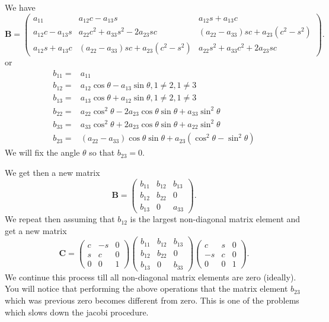 \documentclass[%
oneside,                 %
final,                   %
10pt]{article}
\begin{document}
We have
\[
 \mathbf{B} =\left( \begin{array}{ccc} 
                a_{11} & a_{12}c -a_{13}s& a_{12}s+a_{13}c    \\
                a_{12}c -a_{13}s & a_{22}c^2+a_{33}s^2 -2a_{23}sc& (a_{22}-a_{33})sc +a_{23}(c^2-s^2)     \\
                a_{12}s+a_{13}c & (a_{22}-a_{33})sc +a_{23}(c^2-s^2) & a_{22}s^2+a_{33}c^2 +2a_{23}sc
             \end{array} \right).
\]
or
\begin{align*}
b_{11} =& a_{11} \\
b_{12} =& a_{12}\cos\theta - a_{13}\sin\theta , 1 \ne 2, 1 \ne 3 \\
b_{13} =& a_{13}\cos\theta + a_{12}\sin\theta , 1 \ne 2, 1 \ne 3 \nonumber\\
b_{22} =& a_{22}\cos^2\theta - 2a_{23}\cos\theta \sin\theta +a_{33}\sin^2\theta\nonumber\\
b_{33} =& a_{33}\cos^2\theta +2a_{23}\cos\theta \sin\theta +a_{22}\sin^2\theta\nonumber\\
b_{23} =& (a_{22}-a_{33})\cos\theta \sin\theta +a_{23}(\cos^2\theta-\sin^2\theta)\nonumber 
\end{align*}
We will fix the angle $\theta$ so that $b_{23}=0$.

We get then a new matrix
\[
 \mathbf{B} =\left( \begin{array}{ccc} 
                b_{11} & b_{12}& b_{13}    \\
                b_{12}& b_{22}& 0    \\
                b_{13}& 0& a_{33}
             \end{array} \right).
\]
We repeat then assuming that $b_{12}$ is the largest non-diagonal matrix element and get a
new matrix 
\[
 \mathbf{C} =
      \left( \begin{array}{ccc} 
                c & -s & 0    \\
                s & c & 0     \\
                0 & 0 & 1
             \end{array} \right)\left( \begin{array}{ccc} 
                b_{11} & b_{12} & b_{13}    \\
                b_{12} & b_{22} & 0     \\
                b_{13} & 0 & b_{33}
             \end{array} \right)
              \left( \begin{array}{ccc} 
                c & s & 0    \\
                -s & c & 0     \\
                0 & 0 & 1
             \end{array} \right).
\]
We continue this process till all non-diagonal matrix elements are zero (ideally).
You will notice that performing the above operations that the matrix element 
$b_{23}$ which was previous zero becomes different from zero.  This is one of the problems which slows
down the jacobi procedure.
\end{document}
